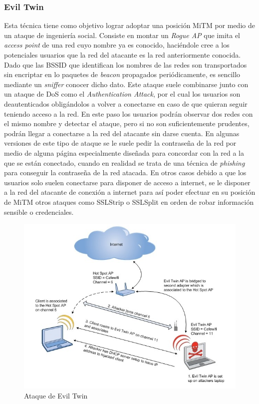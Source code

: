 \documentclass[10pt,a4paper]{article}
\begin{document}
\subsubsection{Evil Twin}

Esta técnica tiene como objetivo lograr adoptar una posición MiTM por medio de un ataque de ingeniería social. Consiste en montar un \textit{Rogue AP} que imita el \textit{access point} de una red cuyo nombre ya es conocido, haciéndole cree a los potenciales usuarios que la red del atacante es la red anteriormente conocida. Dado que las BSSID que identifican los nombres de las redes son transportados sin encriptar en lo paquetes de \textit{beacon} propagados periódicamente, es sencillo mediante un \textit{sniffer} conocer dicho dato. Este ataque suele combinarse junto con un ataque de DoS como el  \textit{Authentication Attack}, por el cual los usuarios son deautenticados obligándolos a volver a conectarse en caso de que quieran seguir teniendo acceso a la red. En este paso los usuarios podrán observar dos redes con el mismo nombre y detectar el ataque, pero si no son suficientemente prudentes, podrán llegar a conectarse a la red del atacante sin darse cuenta. En algunas versiones de este tipo de ataque se le suele pedir la contraseña de la red por medio de alguna página especialmente diseñada para concordar con la red a la que se están conectado, cuando en realidad se trata de una técnica de \textit{phishing} para conseguir la contraseña de la red atacada. En otros casos debido a que los usuarios solo suelen conectarse para disponer de acceso a internet, se le disponer a la red del atacante de conexión a internet para así poder efectuar en su posición de MiTM otros ataques como SSLStrip o SSLSplit en orden de robar información sensible o credenciales.

\begin{figure}[H]
\centerline{\includegraphics[scale=0.5]{images/evil_twin_attack.jpg}}
\caption{Ataque de Evil Twin}
\end{figure}
\end{document}
